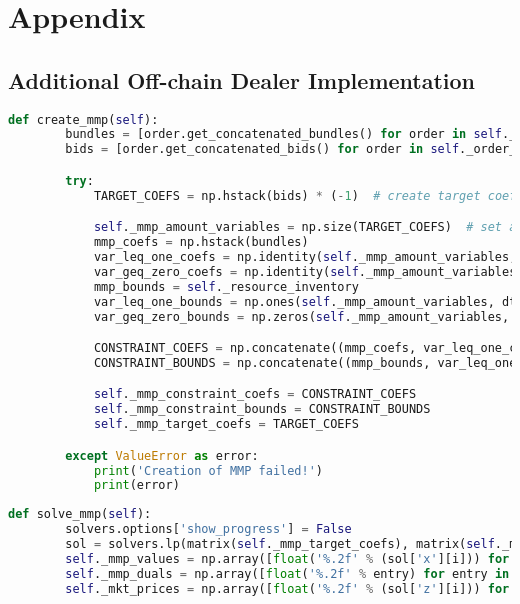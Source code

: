 \section{Appendix}

\subsection{Additional Off-chain Dealer Implementation}
\label{appendix:additional_offchain}

\begin{lstlisting}[float=htbp, label=lst:creation_mmp, caption=Creation of MMP, language=Python]
    def create_mmp(self):
        bundles = [order.get_concatenated_bundles() for order in self._order_handler.get_all_orders()]
        bids = [order.get_concatenated_bids() for order in self._order_handler.get_all_orders()]

        try:
            TARGET_COEFS = np.hstack(bids) * (-1)  # create target coef vector

            self._mmp_amount_variables = np.size(TARGET_COEFS)  # set amount of variables
            mmp_coefs = np.hstack(bundles)
            var_leq_one_coefs = np.identity(self._mmp_amount_variables, dtype=float)  # create constraint matrix for y<=1
            var_geq_zero_coefs = np.identity(self._mmp_amount_variables, dtype=float) * (-1)  # create constraint matrix for y>=0
            mmp_bounds = self._resource_inventory
            var_leq_one_bounds = np.ones(self._mmp_amount_variables, dtype=float)
            var_geq_zero_bounds = np.zeros(self._mmp_amount_variables, dtype=float)

            CONSTRAINT_COEFS = np.concatenate((mmp_coefs, var_leq_one_coefs, var_geq_zero_coefs), axis=0)  # create final constraint matrix
            CONSTRAINT_BOUNDS = np.concatenate((mmp_bounds, var_leq_one_bounds, var_geq_zero_bounds))  # create final bounds matrix

            self._mmp_constraint_coefs = CONSTRAINT_COEFS
            self._mmp_constraint_bounds = CONSTRAINT_BOUNDS
            self._mmp_target_coefs = TARGET_COEFS

        except ValueError as error:
            print('Creation of MMP failed!')
            print(error)
\end{lstlisting}

\begin{lstlisting}[float=htbp, label=lst:solving_mmp, caption=Solving of MMP, language=Python]
    def solve_mmp(self):
        solvers.options['show_progress'] = False
        sol = solvers.lp(matrix(self._mmp_target_coefs), matrix(self._mmp_constraint_coefs), matrix(self._mmp_constraint_bounds))
        self._mmp_values = np.array([float('%.2f' % (sol['x'][i])) for i in range(self._mmp_amount_variables)])
        self._mmp_duals = np.array([float('%.2f' % entry) for entry in sol['z']])
        self._mkt_prices = np.array([float('%.2f' % (sol['z'][i])) for i in range(self._shared_resource_size)])
\end{lstlisting}